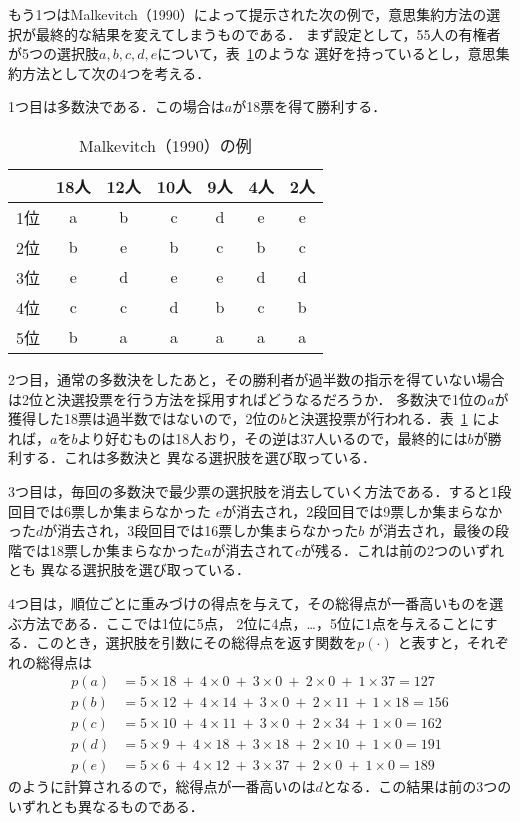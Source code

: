 \documentclass[dvipdfmx]{jsarticle}
\begin{document}
もう1つはMalkevitch（1990）によって提示された次の例で，意思集約方法の選択が最終的な結果を変えてしまうものである．
まず設定として，55人の有権者が5つの選択肢$a,b,c,d,e$について，表~\ref{tab:Malkevitch}のような
選好を持っているとし，意思集約方法として次の4つを考える．

1つ目は多数決である．この場合は$a$が18票を得て勝利する．

\begin{table}[h]
  \caption{Malkevitch（1990）の例}\label{tab:Malkevitch}
  \begin{center}
    \begin{tabular}{c|c|c|c|c|c|c}
      & 18人 & 12人 & 10人 & 9人 & 4人 & 2人 \\ \hline
    1位 & a & b & c & d & e & e \\
    2位 & b & e & b & c & b & c \\
    3位 & e & d & e & e & d & d \\
    4位 & c & c & d & b & c & b \\
    5位 & b & a & a & a & a & a \\
\end{tabular}
  \end{center}
\end{table}

2つ目，通常の多数決をしたあと，その勝利者が過半数の指示を得ていない場合は2位と決選投票を行う方法を採用すればどうなるだろうか．
多数決で1位の$a$が獲得した18票は過半数ではないので，2位の$b$と決選投票が行われる．表~\ref{tab:Malkevitch}
によれば，$a$を$b$より好むものは18人おり，その逆は37人いるので，最終的には$b$が勝利する．これは多数決と
異なる選択肢を選び取っている．

3つ目は，毎回の多数決で最少票の選択肢を消去していく方法である．すると1段回目では6票しか集まらなかった
$e$が消去され，2段回目では9票しか集まらなかった$d$が消去され，3段回目では16票しか集まらなかった$b$
が消去され，最後の段階では18票しか集まらなかった$a$が消去されて$c$が残る．これは前の2つのいずれとも
異なる選択肢を選び取っている．

4つ目は，順位ごとに重みづけの得点を与えて，その総得点が一番高いものを選ぶ方法である．ここでは1位に5点，
2位に4点，\ldots，5位に1点を与えることにする．このとき，選択肢を引数にその総得点を返す関数を$p(\cdot)$
と表すと，それぞれの総得点は
\begin{align*}
  p(a) &= 5 \times 18 \ +\  4 \times 0 \ +\ 3 \times 0 \ +\  2 \times 0\ +\ 1 \times 37 = 127 \\
  p(b) &= 5 \times 12 \ +\  4 \times 14 \ +\ 3 \times 0 \ +\  2 \times 11 \ +\ 1 \times 18 = 156 \\
  p(c) &= 5 \times 10 \ +\  4 \times 11 \ +\ 3 \times 0 \ +\  2 \times 34 \ +\ 1 \times 0 = 162 \\
  p(d) &= 5 \times 9 \ +\  4 \times 18 \ +\ 3 \times 18 \ +\  2 \times 10 \ +\ 1 \times 0 = 191 \\
  p(e) &= 5 \times 6 \ +\  4 \times 12 \ +\ 3 \times 37 \ +\  2 \times 0 \ +\ 1 \times 0 = 189
\end{align*}
のように計算されるので，総得点が一番高いのは$d$となる．この結果は前の3つのいずれとも異なるものである．
\end{document}
